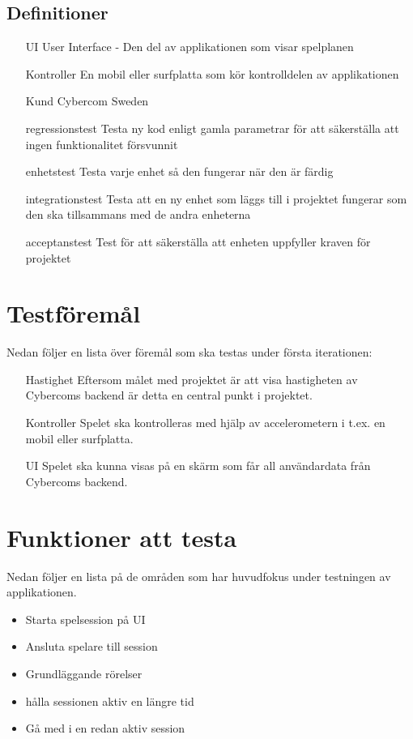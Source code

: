 \documentclass[10pt]{article}
\begin{document}
	\subsection{Definitioner}
		\begin{itemize}
		\item [UI] User Interface - Den del av applikationen som visar spelplanen
		\item [Kontroller] En mobil eller surfplatta som kör kontrolldelen av applikationen
		\item [Kund] Cybercom Sweden
		\item [regressionstest] Testa ny kod enligt gamla parametrar för att säkerställa att ingen funktionalitet försvunnit
		\item [enhetstest] Testa varje enhet så den fungerar när den är färdig
		\item [integrationstest] Testa att en ny enhet som läggs till i projektet fungerar som den ska tillsammans med de andra enheterna
		\item [acceptanstest] Test för att säkerställa att enheten uppfyller kraven för projektet
		\end{itemize}	

	
\section{Testföremål}
	Nedan följer en lista över föremål som ska testas under första iterationen:
	\begin{itemize}
	\item [Hastighet] Eftersom målet med projektet är att visa hastigheten av Cybercoms backend är detta en central punkt i projektet.
	\item [Kontroller] Spelet ska kontrolleras med hjälp av accelerometern i t.ex. en mobil eller surfplatta.
	\item [UI] Spelet ska kunna visas på en skärm som får all användardata från Cybercoms backend.
	\end{itemize}
	
	
	
	

\section{Funktioner att testa}
	Nedan följer en lista på de områden som har huvudfokus under testningen av applikationen.
	\begin{itemize}
	\item Starta spelsession på UI 
	\item Ansluta spelare till session
	\item Grundläggande rörelser
	\item hålla sessionen aktiv en längre tid
	\item Gå med i en redan aktiv session
	\end{itemize}
	
\end{document}
